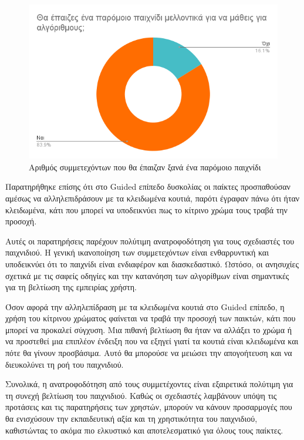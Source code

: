 \begin{figure}[H]
    \centering
    \includegraphics[width=0.7\linewidth]{sections/5/2/images/would_you_play_a_similar_game_in_the_future}
    \caption{Αριθμός συμμετεχόντων που θα έπαιζαν ξανά ένα παρόμοιο παιχνίδι}
    \label{fig:would_you_play_a_similar_game_in_the_future}
\end{figure}

Παρατηρήθηκε επίσης ότι στο Guided επίπεδο δυσκολίας οι παίκτες προσπαθούσαν αμέσως να αλληλεπιδράσουν με τα κλειδωμένα κουτιά, παρότι έγραφαν πάνω ότι ήταν κλειδωμένα, κάτι που μπορεί να υποδεικνύει πως το κίτρινο χρώμα τους τραβά την προσοχή.

Αυτές οι παρατηρήσεις παρέχουν πολύτιμη ανατροφοδότηση για τους σχεδιαστές του παιχνιδιού. Η γενική ικανοποίηση των συμμετεχόντων είναι ενθαρρυντική και υποδεικνύει ότι το παιχνίδι είναι ενδιαφέρον και διασκεδαστικό. Ωστόσο, οι ανησυχίες σχετικά με τις σαφείς οδηγίες και την κατανόηση των αλγορίθμων είναι σημαντικές για τη βελτίωση της εμπειρίας χρήστη.

Όσον αφορά την αλληλεπίδραση με τα κλειδωμένα κουτιά στο Guided επίπεδο, η χρήση του κίτρινου χρώματος φαίνεται να τραβά την προσοχή των παικτών, κάτι που μπορεί να προκαλεί σύγχυση. Μια πιθανή βελτίωση θα ήταν να αλλάξει το χρώμα ή να προστεθεί μια επιπλέον ένδειξη που να εξηγεί γιατί τα κουτιά είναι κλειδωμένα και πότε θα γίνουν προσβάσιμα. Αυτό θα μπορούσε να μειώσει την απογοήτευση και να διευκολύνει τη ροή του παιχνιδιού.

Συνολικά, η ανατροφοδότηση από τους συμμετέχοντες είναι εξαιρετικά πολύτιμη για τη συνεχή βελτίωση του παιχνιδιού. Καθώς οι σχεδιαστές λαμβάνουν υπόψη τις προτάσεις και τις παρατηρήσεις των χρηστών, μπορούν να κάνουν προσαρμογές που θα ενισχύσουν την εκπαιδευτική αξία και τη χρηστικότητα του παιχνιδιού, καθιστώντας το ακόμα πιο ελκυστικό και αποτελεσματικό για όλους τους παίκτες.


